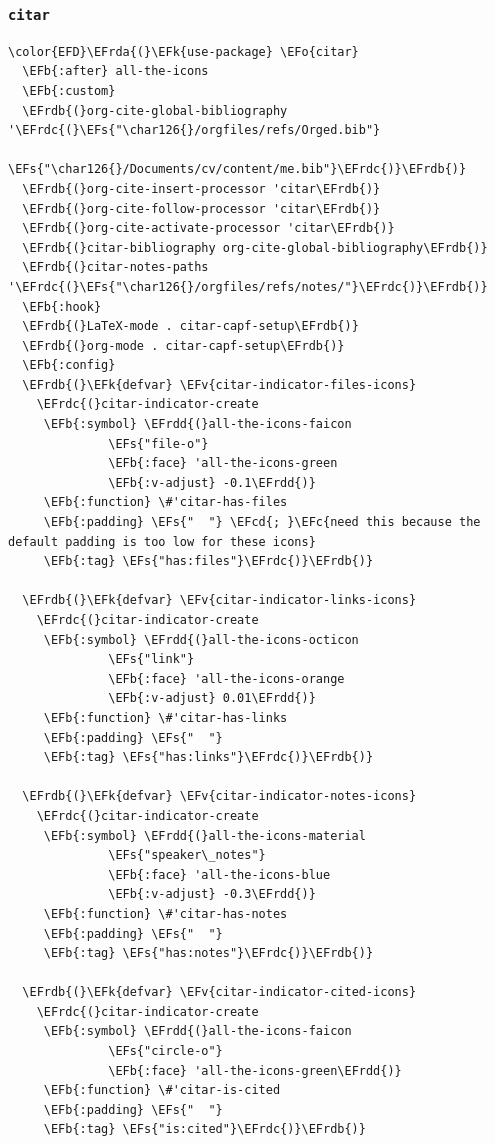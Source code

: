 \documentclass[11pt]{article}
\newcommand{\EFc}[1]{\textcolor{EFc}{#1}} %
\newcommand{\EFcd}[1]{\textcolor{EFcd}{#1}} %
\newcommand{\EFs}[1]{\textcolor{EFs}{#1}} %
\newcommand{\EFk}[1]{\textcolor{EFk}{#1}} %
\newcommand{\EFb}[1]{\textcolor{EFb}{#1}} %
\newcommand{\EFv}[1]{\textcolor{EFv}{#1}} %
\newcommand{\EFo}[1]{\textcolor{EFo}{#1}} %
\newcommand{\EFrda}[1]{\textcolor{EFrda}{#1}} %
\newcommand{\EFrdb}[1]{\textcolor{EFrdb}{#1}} %
\newcommand{\EFrdc}[1]{\textcolor{EFrdc}{#1}} %
\newcommand{\EFrdd}[1]{\textcolor{EFrdd}{#1}} %
\begin{document}
\subsubsection{\texttt{citar}}
\label{sec:org273b919}
\begin{Code}
\begin{Verbatim}
\color{EFD}\EFrda{(}\EFk{use-package} \EFo{citar}
  \EFb{:after} all-the-icons
  \EFb{:custom}
  \EFrdb{(}org-cite-global-bibliography '\EFrdc{(}\EFs{"\char126{}/orgfiles/refs/Orged.bib"}
                                  \EFs{"\char126{}/Documents/cv/content/me.bib"}\EFrdc{)}\EFrdb{)}
  \EFrdb{(}org-cite-insert-processor 'citar\EFrdb{)}
  \EFrdb{(}org-cite-follow-processor 'citar\EFrdb{)}
  \EFrdb{(}org-cite-activate-processor 'citar\EFrdb{)}
  \EFrdb{(}citar-bibliography org-cite-global-bibliography\EFrdb{)}
  \EFrdb{(}citar-notes-paths '\EFrdc{(}\EFs{"\char126{}/orgfiles/refs/notes/"}\EFrdc{)}\EFrdb{)}
  \EFb{:hook}
  \EFrdb{(}LaTeX-mode . citar-capf-setup\EFrdb{)}
  \EFrdb{(}org-mode . citar-capf-setup\EFrdb{)}
  \EFb{:config}
  \EFrdb{(}\EFk{defvar} \EFv{citar-indicator-files-icons}
    \EFrdc{(}citar-indicator-create
     \EFb{:symbol} \EFrdd{(}all-the-icons-faicon
              \EFs{"file-o"}
              \EFb{:face} 'all-the-icons-green
              \EFb{:v-adjust} -0.1\EFrdd{)}
     \EFb{:function} \#'citar-has-files
     \EFb{:padding} \EFs{"  "} \EFcd{; }\EFc{need this because the default padding is too low for these icons}
     \EFb{:tag} \EFs{"has:files"}\EFrdc{)}\EFrdb{)}

  \EFrdb{(}\EFk{defvar} \EFv{citar-indicator-links-icons}
    \EFrdc{(}citar-indicator-create
     \EFb{:symbol} \EFrdd{(}all-the-icons-octicon
              \EFs{"link"}
              \EFb{:face} 'all-the-icons-orange
              \EFb{:v-adjust} 0.01\EFrdd{)}
     \EFb{:function} \#'citar-has-links
     \EFb{:padding} \EFs{"  "}
     \EFb{:tag} \EFs{"has:links"}\EFrdc{)}\EFrdb{)}

  \EFrdb{(}\EFk{defvar} \EFv{citar-indicator-notes-icons}
    \EFrdc{(}citar-indicator-create
     \EFb{:symbol} \EFrdd{(}all-the-icons-material
              \EFs{"speaker\_notes"}
              \EFb{:face} 'all-the-icons-blue
              \EFb{:v-adjust} -0.3\EFrdd{)}
     \EFb{:function} \#'citar-has-notes
     \EFb{:padding} \EFs{"  "}
     \EFb{:tag} \EFs{"has:notes"}\EFrdc{)}\EFrdb{)}

  \EFrdb{(}\EFk{defvar} \EFv{citar-indicator-cited-icons}
    \EFrdc{(}citar-indicator-create
     \EFb{:symbol} \EFrdd{(}all-the-icons-faicon
              \EFs{"circle-o"}
              \EFb{:face} 'all-the-icons-green\EFrdd{)}
     \EFb{:function} \#'citar-is-cited
     \EFb{:padding} \EFs{"  "}
     \EFb{:tag} \EFs{"is:cited"}\EFrdc{)}\EFrdb{)}


\end{Verbatim}
\end{Code}
\end{document}
